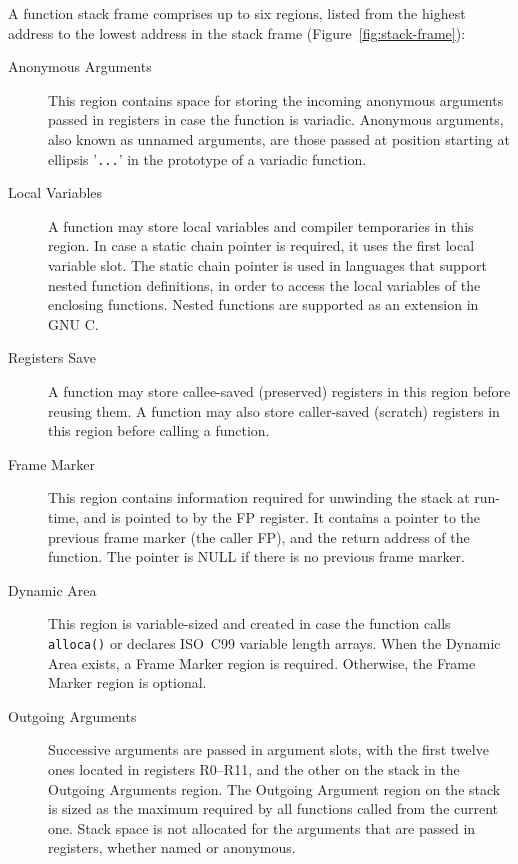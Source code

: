 A function stack frame comprises up to six regions, listed from the
highest address to the lowest address in the stack frame
(Figure~\ref{fig:stack-frame}): \begin{description}

\item[Anonymous Arguments] This region contains space for storing the
    incoming anonymous arguments passed in registers in case the function is
    variadic. Anonymous arguments, also known as unnamed arguments, are those
    passed at position starting at ellipsis '\texttt{...}' in the prototype
    of a variadic function.

\item[Local Variables] A function may store local variables and
    compiler temporaries in this region. In case a static chain pointer is
    required, it uses the first local variable slot. The static chain pointer is
    used in languages that support nested function definitions, in order to
    access the local variables of the enclosing functions. Nested functions are
    supported as an extension in GNU C.

\item[Registers Save] A function may store callee-saved (preserved)
    registers in this region before reusing them. A function may also store
    caller-saved (scratch) registers in this region before calling a function.

\item[Frame Marker] This region contains information required for
    unwinding the stack at run-time, and is pointed to by the FP register. It
    contains a pointer to the previous frame marker (the caller FP), and the
    return address of the function. The pointer is NULL if there is no previous
    frame marker.

\item[Dynamic Area] This region is variable-sized and created in case the
    function calls \verb|alloca()| or declares ISO~C99 variable length arrays.
    When the Dynamic Area exists, a Frame Marker region is required. Otherwise,
    the Frame Marker region is optional.

\item[Outgoing Arguments] Successive arguments are passed in argument slots,
    with the first twelve ones located in registers R0--R11, and the other on
    the stack in the Outgoing Arguments region. The Outgoing Argument region on
    the stack is sized as the maximum required by all functions called from the
    current one.  Stack space is not allocated for the arguments that are passed
    in registers, whether named or anonymous.

\end{description}

